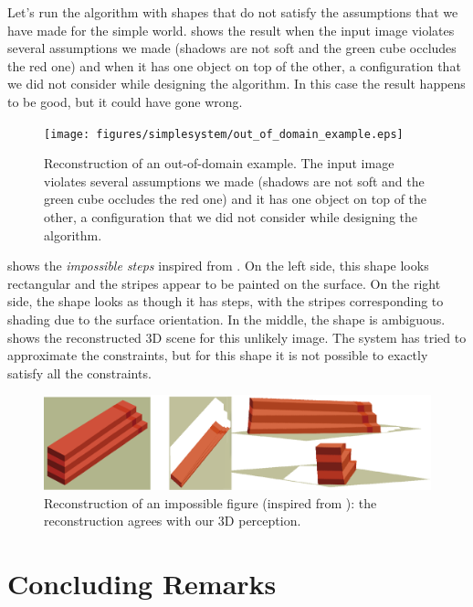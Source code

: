 Let's run the algorithm with shapes that do not satisfy the assumptions that we have made for the simple world. \Fig{\ref{fig:out_of_domain}} shows the result when the input image violates several assumptions we made (shadows are not soft and the green cube occludes the red one) and when it has one object on top of the other, a configuration that we did not consider while designing the algorithm. In this case the result happens to be good, but it could have gone wrong.



\begin{figure}[t]
\centerline{
\texttt{[image: figures/simplesystem/out\_of\_domain\_example.eps]}
} 
\caption{Reconstruction of an out-of-domain example. The input image violates several assumptions we made (shadows are not soft and the green cube occludes the red one) and it has one object on top of the other, a configuration that we did not consider while designing the algorithm. 
} 
\label{fig:out_of_domain}
\end{figure}

\Fig{\ref{fig:impossible}} shows the {\em impossible steps} inspired from \cite{Adelson99}. On the left side, this shape looks rectangular and the stripes appear to be painted on the surface. On the right side, the shape looks as though it has steps, with the stripes corresponding to shading due to the surface orientation. In the middle, the shape is ambiguous. 
\Fig{\ref{fig:impossible}} shows the reconstructed 3D scene for this unlikely image. The system has tried to approximate the constraints, but for this shape it is not possible to exactly satisfy all the constraints.  


\begin{figure}[t]
\centerline{
\includegraphics[width=1\linewidth]{figures/simplesystem/steps.pdf}
} 
\caption{Reconstruction of an impossible figure (inspired from \cite{Adelson99}): the reconstruction agrees with our 3D perception.} 
\label{fig:impossible}
\end{figure}


\section{Concluding Remarks}

